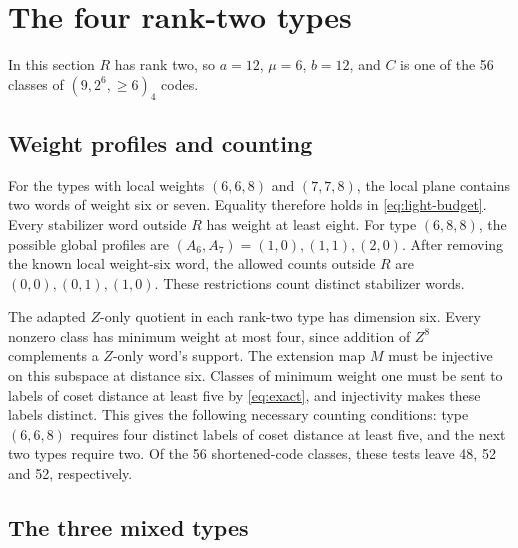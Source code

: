 \section{The four rank-two types}\label{sec:rank-two}

In this section \(R\) has rank two, so \(a=12\), \(\mu=6\), \(b=12\),
and \(C\) is one of the 56 classes of \((9,2^6,\geq6)_4\) codes.

\subsection{Weight profiles and counting}

For the types with local weights \((6,6,8)\) and \((7,7,8)\), the local
plane contains two words of weight six or seven. Equality therefore
holds in \eqref{eq:light-budget}.
Every stabilizer word outside \(R\) has weight at least eight.
For type \((6,8,8)\), the possible global profiles are
\((A_6,A_7)=(1,0),(1,1),(2,0)\).
After removing the known local weight-six word, the allowed counts outside \(R\) are \((0,0),(0,1),(1,0)\).
These restrictions count distinct stabilizer words.

The adapted \(Z\)-only quotient in each rank-two type has dimension six.
Every nonzero class has minimum weight at most four, since addition of \(Z^8\)
complements a \(Z\)-only word's support. The extension map \(M\) must be
injective on this subspace at distance six. Classes of minimum weight one
must be sent to labels of coset distance at least five by
\eqref{eq:exact}, and injectivity makes these labels distinct.
This gives the following necessary counting conditions: type
\((6,6,8)\) requires four distinct labels of coset distance at least
five, and the next two types require two. Of the 56 shortened-code
classes, these tests leave 48, 52 and 52, respectively.

\subsection{The three mixed types}

